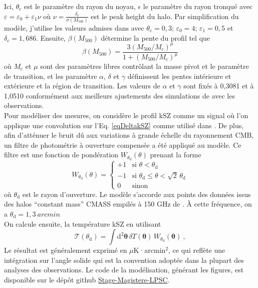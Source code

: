 \documentclass[a4paper, french, twoside, twocolumn, 11 pt]{article}
\newcommand{\deriv}{\mathrm{d}}
\begin{document}
Ici, $\theta_\text{c}$ est le paramètre du rayon du noyau, $\epsilon$ le paramètre du rayon tronqué avec $\varepsilon=\varepsilon_0+\varepsilon_1\nu$ où $\nu=\frac{\delta_c}{\sigma(M_{500})}$ est le peak height du halo. Par simplification du modèle, j'utilise les valeurs admises dans \cite{kovac2025baryonificationiiconstrainingfeedback} avec $\theta_\text{c}=0,3$; $\varepsilon_0 = 4$; $\varepsilon_1=0,5$ et $\delta_c=1,686$. Ensuite, $\beta(M_{500})$ détermine la pente du profil tel que
\begin{equation}
\beta(M_{500})=\frac{3(M_{500}/M_\text{c})^{\mu}}{1+(M_{500}/M_\text{c})^{\mu}}
\end{equation}
où $M_\text{c}$ et $\mu$ sont des paramètres libres contrôlant la masse pivot et le paramètre de transition, et les paramètre $\alpha$, $\delta$ et $\gamma$ définissent les pentes intérieure et extérieure et la région de transition. Les valeurs de $\alpha$ et $\gamma$ sont fixés à 0,3081 et à 1,0510 conformément aux meilleurs ajustements des simulations de \cite{Arnaud_2010} avec les observations.\\
Pour modéliser des mesures, on considère le profil kSZ comme un signal où l'on applique une convolution sur l'Eq. \ref{eqDeltakSZ} comme utilisé dans \cite{Schaan_2021}. De plus, afin d'atténuer le bruit dû aux variations à grande échelle du rayonnement CMB, un filtre de photométrie à ouverture compensée a été appliqué au modèle. Ce filtre est une fonction de pondération $W_{\theta_\text{d}}(\theta)$ prenant la forme
\[
W_{\theta_\text{d}}(\theta) =
\begin{cases}
+1 & \text{si } \theta < \theta_\text{d} \\
-1 & \text{si } \theta_\text{d} \leq \theta < \sqrt{2}\, \theta_\text{d} \\
0 & \text{sinon}
\end{cases}
\]
où $\theta_\text{d}$ est le rayon d'ouverture. Le modèle s'accorde aux points des données issus des halos \enquote{constant mass} CMASS empilés à 150 GHz de \cite{Schaan_2021}. À cette fréquence, on a $\theta_\text{d}=1,3\ \unit{arcmin}$\\
On calcule ensuite, la température kSZ en utilisant
\begin{equation}
    \mathcal{T}(\theta_\text{d})=\int \deriv^2{\bm{\theta}}\,\delta T({\bm{\theta}})\,W_{\theta_\text{d}}({\bm{\theta}})\: ,
\end{equation}
Le résultat est généralement exprimé en $\mu$K·arcmin$^2$, ce qui reflète une intégration sur l'angle solide qui est la convention adoptée dans la plupart des analyses des observations\cite{bigwood2025kineticsunyaevzeldovicheffect, Hadzhiyska2023}. Le code de la modélisation, générant les figures, est disponible sur le dépôt github \href{https://github.com/AdrikForgefeu/Stage-Magistere-LPSC.git}{Stage-Magistere-LPSC}.
\end{document}
